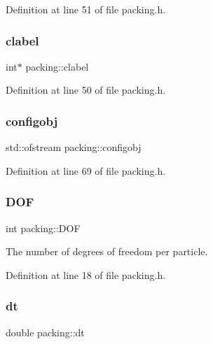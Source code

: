 Definition at line 51 of file packing.\+h.

\mbox{\label{classpacking_a3610364abb17fe2c0bacec06e05d9123}} 
\subsubsection{\texorpdfstring{clabel}{clabel}}
{\footnotesize\ttfamily int$\ast$ packing\+::clabel\hspace{0.3cm}{\ttfamily [protected]}}



Definition at line 50 of file packing.\+h.

\mbox{\label{classpacking_af156dc6a748d6330d8d058d7b623f33e}} 
\subsubsection{\texorpdfstring{configobj}{configobj}}
{\footnotesize\ttfamily std\+::ofstream packing\+::configobj\hspace{0.3cm}{\ttfamily [protected]}}



Definition at line 69 of file packing.\+h.

\mbox{\label{classpacking_a154fee4288694b65d28f5d904b1784b6}} 
\subsubsection{\texorpdfstring{D\+OF}{DOF}}
{\footnotesize\ttfamily int packing\+::\+D\+OF\hspace{0.3cm}{\ttfamily [protected]}}



The number of degrees of freedom per particle. 



Definition at line 18 of file packing.\+h.

\mbox{\label{classpacking_a61dd57ff727cdffa0573189b14a372d3}} 
\subsubsection{\texorpdfstring{dt}{dt}}
{\footnotesize\ttfamily double packing\+::dt\hspace{0.3cm}{\ttfamily [protected]}}



